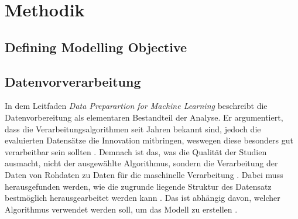 \documentclass[12pt]{report}
\begin{document}
	\chapter{Methodik} %
	\section{Defining Modelling Objective}
	\section{Datenvorverarbeitung}
	In dem Leitfaden \textit{Data Preparartion for Machine Learning} beschreibt \cite{Brownlee.2020} die Datenvorbereitung als elementaren Bestandteil der Analyse. Er argumentiert, dass die Verarbeitungsalgorithmen seit Jahren bekannt sind, jedoch die evaluierten Datensätze die Innovation mitbringen, weswegen diese besonders gut verarbeitbar sein sollten \cite[14]{Brownlee.2020}. Demnach ist das,  was die Qualität der Studien ausmacht, nicht der ausgewählte Algorithmus, sondern die Verarbeitung der Daten von Rohdaten zu Daten für die maschinelle Verarbeitung \cite[9]{Brownlee.2020}. Dabei muss herausgefunden werden, wie die zugrunde liegende Struktur des Datensatz bestmöglich herausgearbeitet werden kann \cite[8]{Brownlee.2020}. Das ist abhängig davon, welcher Algorithmus verwendet werden soll, um das Modell zu erstellen \cite[12]{Brownlee.2020}. 
\end{document}
